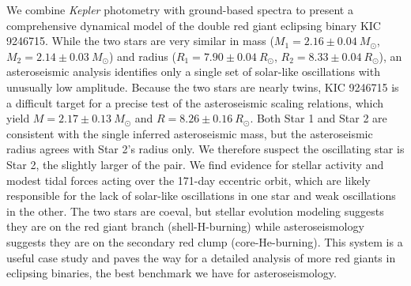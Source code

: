 We combine \emph{Kepler} photometry with ground-based spectra to present a comprehensive dynamical model of the double red giant eclipsing binary KIC 9246715. While the two stars are very similar in mass ($M_1 = 2.16 \pm 0.04\ M_{\odot}$, $M_2 = 2.14 \pm 0.03\ M_{\odot}$) and radius ($R_1 = 7.90 \pm 0.04 \ R_{\odot}$, $R_2 = 8.33 \pm 0.04 \ R_{\odot}$), an asteroseismic analysis identifies only a single set of solar-like oscillations with unusually low amplitude. Because the two stars are nearly twins, KIC 9246715 is a difficult target for a precise test of the asteroseismic scaling relations, which yield $M = 2.17 \pm 0.13 \ M_{\odot}$ and $R = 8.26 \pm 0.16 \ R_{\odot}$. Both Star 1 and Star 2 are consistent with the single inferred asteroseismic mass, but the asteroseismic radius agrees with Star 2's radius only. We therefore suspect the oscillating star is Star 2, the slightly larger of the pair. We find evidence for stellar activity and modest tidal forces acting over the 171-day eccentric orbit, which are likely responsible for the lack of solar-like oscillations in one star and weak oscillations in the other. The two stars are coeval, but stellar evolution modeling suggests they are on the red giant branch (shell-H-burning) while asteroseismology suggests they are on the secondary red clump (core-He-burning). This system is a useful case study and paves the way for a detailed analysis of more red giants in eclipsing binaries, the best benchmark we have for asteroseismology.

  
  
  